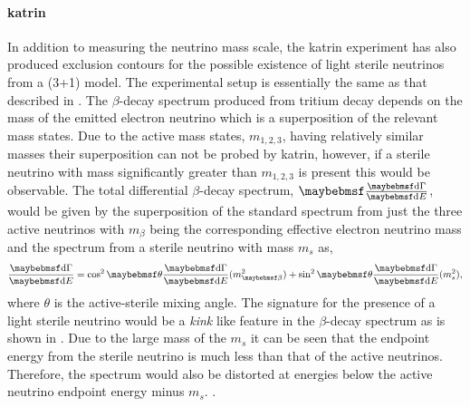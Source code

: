 \paragraph{\gls{katrin}}

In addition to measuring the neutrino mass scale, the \gls{katrin} experiment has also produced exclusion contours for the possible existence of light sterile neutrinos from a (3+1) model. The experimental setup is essentially the same as that described in . The $\beta$-decay spectrum produced from tritium decay depends on the mass of the emitted electron neutrino which is a superposition of the relevant mass states. Due to the active mass states, $m_{1,2,3}$, having relatively similar masses their superposition can not be probed by \gls{katrin}, however, if a sterile neutrino with mass significantly greater than $m_{1,2,3}$ is present this would be observable. The total differential $\beta$-decay spectrum, $\dByd{\Gamma}{E}$, would be given by the superposition of the standard spectrum from just the three active neutrinos with $m_{\beta}$ being the corresponding effective electron neutrino mass and the spectrum from a sterile neutrino with mass $m_s$ as, 
\begin{equation}
    \frac{\diff\Gamma}{\diff E} = \cos^2{\theta} \frac{\diff\Gamma}{\diff E}(m_{\beta}^2) + \sin^2{\theta} \frac{\diff\Gamma}{\diff E}(m_s^2),
\end{equation}
where $\theta$ is the active-sterile mixing angle. The signature for the presence of a light sterile neutrino would be a \textit{kink} like feature in the $\beta$-decay spectrum as is shown in . Due to the large mass of the $m_s$ it can be seen that the endpoint energy from the sterile neutrino is much less than that of the active neutrinos. Therefore, the spectrum would also be distorted at energies below the active neutrino endpoint energy minus $m_{s}$. \cite{A_novel_detector_system_for_KATRIN_to_search_for_keV_scale_sterile_neutrinos}.

